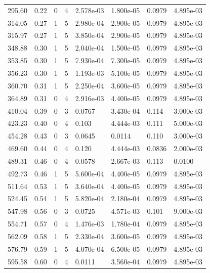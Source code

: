 \documentclass[preview]{standalone}
\begin{document}
{{\begin{tabular}{L{1.2cm}C{1.2cm} C{0.3cm}C{0.5cm} C{1.4cm}C{1.4cm} C{1.4cm}C{1.4cm}}
  295.60  &  0.22  & 0     &  4 &  2.578e-03  & 1.800e-05  & 0.0979 &  4.895e-03   \\ 
  314.05  &  0.27  & 1     &  5 &  2.980e-04  & 2.900e-05  & 0.0979 &  4.895e-03   \\ 
  315.97  &  0.27  & 1     &  5 &  3.850e-04  & 2.900e-05  & 0.0979 &  4.895e-03   \\ 
  348.88  &  0.30  & 1     &  5 &  2.040e-04  & 1.500e-05  & 0.0979 &  4.895e-03   \\ 
  353.85  &  0.30  & 1     &  5 &  7.930e-04  & 7.300e-05  & 0.0979 &  4.895e-03   \\ 
  356.23  &  0.30  & 1     &  5 &  1.193e-03  & 5.100e-05  & 0.0979 &  4.895e-03   \\ 
  360.70  &  0.31  & 1     &  5 &  2.250e-04  & 3.600e-05  & 0.0979 &  4.895e-03   \\ 
  364.89  &  0.31  & 0     &  4 &  2.916e-03  & 4.400e-05  & 0.0979 &  4.895e-03   \\ 
  410.04  &  0.39  & 0     &  3 &  0.0767  & 3.430e-04  & 0.114 &  3.000e-03   \\ 
  423.23  &  0.40  & 0     &  4 &  0.103  & 4.444e-03  & 0.111 &  5.000e-03   \\ 
  454.28  &  0.43  & 0     &  3 &  0.0645  & 0.0114  & 0.110 &  3.000e-03   \\ 
  469.60  &  0.44  & 0     &  4 &  0.120  & 4.444e-03  & 0.0836 &  2.000e-03   \\ 
  489.31  &  0.46  & 0     &  4 &  0.0578  & 2.667e-03  & 0.113 &  0.0100   \\ 
  492.73  &  0.46  & 1     &  5 &  5.600e-04  & 4.400e-05  & 0.0979 &  4.895e-03   \\ 
  511.64  &  0.53  & 1     &  5 &  3.640e-04  & 4.400e-05  & 0.0979 &  4.895e-03   \\ 
  524.45  &  0.54  & 1     &  5 &  5.820e-04  & 2.180e-04  & 0.0979 &  4.895e-03   \\ 
  547.98  &  0.56  & 0     &  3 &  0.0725  & 4.571e-03  & 0.101 &  9.000e-03   \\ 
  554.71  &  0.57  & 0     &  4 &  1.476e-03  & 1.780e-04  & 0.0979 &  4.895e-03   \\ 
  562.09  &  0.58  & 1     &  5 &  2.330e-04  & 3.600e-05  & 0.0979 &  4.895e-03   \\ 
  576.79  &  0.59  & 1     &  5 &  4.070e-04  & 6.500e-05  & 0.0979 &  4.895e-03   \\ 
  595.58  &  0.60  & 0     &  4 &  0.0111  & 3.560e-04  & 0.0979 &  4.895e-03   \\ 

\end{tabular}}}
\end{document}
